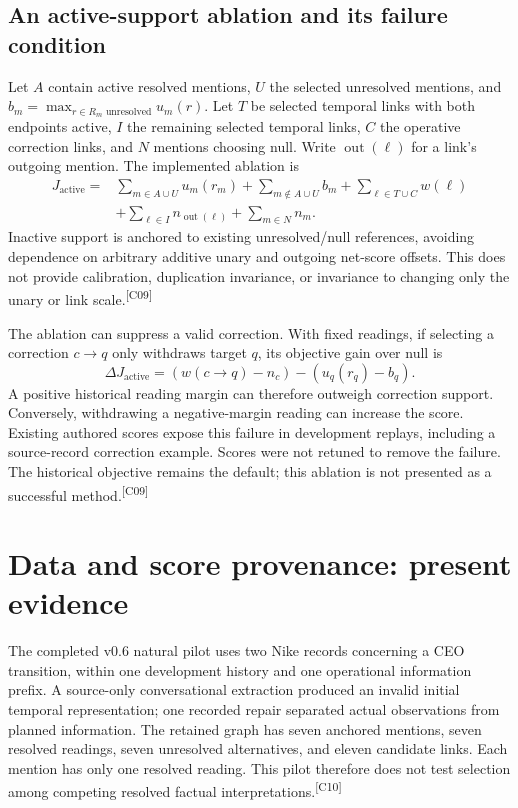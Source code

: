 \documentclass[10pt,letterpaper]{article}
\newcommand{\claim}[1]{\textsuperscript{\scriptsize[#1]}}
\begin{document}
\subsection{An active-support ablation and its failure condition}
\label{sec:objective}
Let $A$ contain active resolved mentions, $U$ the selected unresolved mentions,
and $b_m=\max_{r\in R_m\text{ unresolved}}u_m(r)$. Let $T$ be selected temporal
links with both endpoints active, $I$ the remaining selected temporal links,
$C$ the operative correction links, and $N$ mentions choosing null. Write
$\operatorname{out}(\ell)$ for a link's outgoing mention. The
implemented ablation is
\begin{align}
J_{\mathrm{active}}={}&\sum_{m\in A\cup U}u_m(r_m)
+\sum_{m\notin A\cup U}b_m
+\sum_{\ell\in T\cup C}w(\ell) \nonumber\\
&+\sum_{\ell\in I}n_{\operatorname{out}(\ell)}+\sum_{m\in N}n_m.
\label{eq:active}
\end{align}
Inactive support is anchored to existing unresolved/null references, avoiding
dependence on arbitrary additive unary and outgoing net-score offsets. This
does not provide calibration, duplication invariance, or invariance to changing
only the unary or link scale.\claim{C09}

The ablation can suppress a valid correction. With fixed readings, if selecting
a correction $c\to q$ only withdraws target $q$, its objective gain over null is
\begin{equation}
\Delta J_{\mathrm{active}}=(w(c\to q)-n_c)-(u_q(r_q)-b_q).
\end{equation}
A positive historical reading margin can therefore outweigh correction support.
Conversely, withdrawing a negative-margin reading can increase the score.
Existing authored scores expose this failure in development replays, including
a source-record correction example. Scores were not retuned to remove the
failure. The historical objective remains the default; this ablation is not
presented as a successful method.\claim{C09}

\section{Data and score provenance: present evidence}
\label{sec:data}
The completed v0.6 natural pilot uses two Nike records concerning a CEO
transition, within one development history and one operational information
prefix. A source-only conversational extraction produced an invalid initial
temporal representation; one recorded repair separated actual observations
from planned information. The retained graph has seven anchored mentions,
seven resolved readings, seven unresolved alternatives, and eleven candidate
links. Each mention has only one resolved reading. This pilot therefore does
not test selection among competing resolved factual interpretations.\claim{C10}
\end{document}
